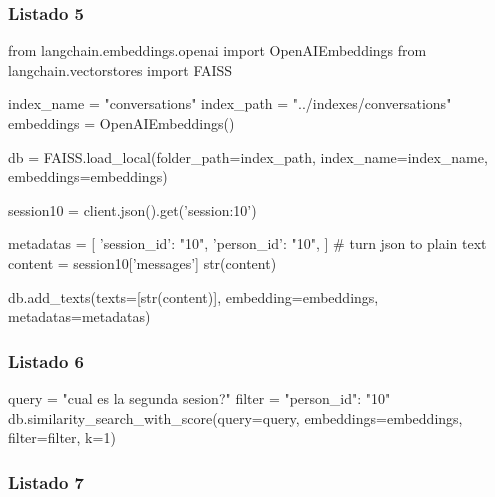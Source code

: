 \subsubsection{Listado 5}
\label{anexo:code-4-1-4-5}

\begin{APACode}
from langchain.embeddings.openai import OpenAIEmbeddings 
from langchain.vectorstores import FAISS

index_name = "conversations"
index_path = "../indexes/conversations" 
embeddings = OpenAIEmbeddings()

db = FAISS.load_local(folder_path=index_path, index_name=index_name, 
                      embeddings=embeddings)

session10 = client.json().get('session:10')

metadatas = [{ 
    'session_id': "10",
    'person_id': "10",
}]
# turn json to plain text 
content = session10['messages'] 
str(content)

db.add_texts(texts=[str(content)], embedding=embeddings, 
             metadatas=metadatas)
\end{APACode}

\subsubsection{Listado 6}
\label{anexo:code-4-1-4-6}

\begin{APACode}
query = "cual es la segunda sesion?" 
filter = {"person_id": "10"}
db.similarity_search_with_score(query=query, embeddings=embeddings, 
                                filter=filter, k=1)
\end{APACode}

\subsubsection{Listado 7}
\label{anexo:code-4-1-4-7}


